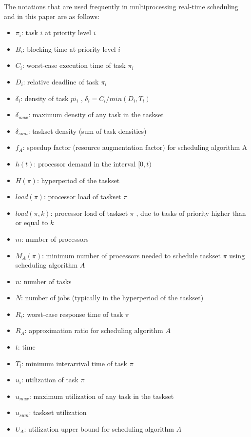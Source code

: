 \documentclass[preprint,12pt]{elsarticle}
\begin{document}
The notations that are used frequently in multiprocessing real-time scheduling and in this paper are as follows\cite{davis2011survey}:

\begin{itemize}
\item $\pi_i$: task $i$ at priority level $i$
\item $B_i$: blocking time at priority level $i$
\item $C_i$: worst-case execution time of task $\pi_i$
\item $D_i$: relative deadline of task $\pi_i$
\item $\delta_i$: density of task $pi_i$ , $\delta_i = C_i/ min(D_i , T_i )$
\item $\delta_{max}$: maximum density of any task in the taskset
\item $\delta_{sum}$: taskset density (sum of task densities)
\item $f_A$: speedup factor (resource augmentation factor) for scheduling algorithm A
\item $h(t)$: processor demand in the interval $[0,t)$
\item $H(\pi)$: hyperperiod of the taskset
\item $load(\pi)$: processor load of taskset $\pi$
\item $load(\pi, k)$: processor load of taskset $\pi$ , due to tasks of priority higher than or equal to $k$
\item $m$: number of processors
\item $M_A(\pi)$: minimum number of processors needed to schedule taskset
    $\pi$ using scheduling algorithm $A$ 
\item $n$: number of tasks
\item $N$: number of jobs (typically in the hyperperiod of the taskset)
\item $R_i$: worst-case response time of task $\pi$
\item $R_A$: approximation ratio for scheduling algorithm $A$
\item $t$: time
\item $T_i$: minimum interarrival time of task $\pi$
\item $u_i$: utilization of task $\pi$
\item $u_{max}$: maximum utilization of any task in the taskset
\item $u_{sum}$: taskset utilization
\item $U_A$: utilization upper bound for scheduling algorithm $A$
\end{itemize}
\end{document}
